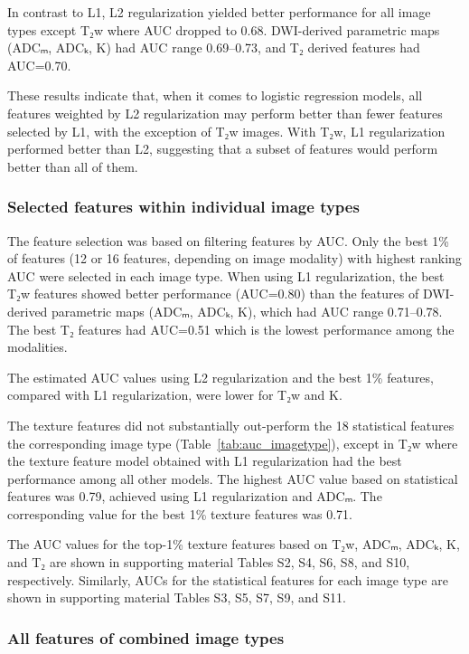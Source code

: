 \documentclass[10pt,letterpaper]{article}
\begin{document}
In contrast to L1, L2 regularization yielded better performance for all image
types except T₂w where AUC dropped to 0.68. DWI-derived parametric maps (ADCₘ,
ADCₖ, K) had AUC range 0.69--0.73, and T₂ derived features had AUC=0.70.

These results indicate that, when it comes to logistic regression models, all
features weighted by L2 regularization may perform better than fewer features
selected by L1, with the exception of T₂w images. With T₂w, L1 regularization
performed better than L2, suggesting that a subset of features would perform
better than all of them.


\subsubsection{Selected features within individual image types}

The feature selection was based on filtering features by AUC\@. Only the best
1\% of features (12 or 16 features, depending on image modality) with highest
ranking AUC were selected in each image type. When using L1 regularization, the
best T₂w features showed better performance (AUC=0.80) than the features of
DWI-derived parametric maps (ADCₘ, ADCₖ, K), which had AUC range 0.71--0.78. The
best T₂ features had AUC=0.51 which is the lowest performance among the
modalities.

The estimated AUC values using L2 regularization and the best 1\% features,
compared with L1 regularization, were lower for T₂w and K.

The texture features did not substantially out-perform the 18 statistical
features the corresponding image type (Table~\ref{tab:auc_imagetype}), except in
T₂w where the texture feature model obtained with L1 regularization had the best
performance among all other models. The highest AUC value based on statistical
features was 0.79, achieved using L1 regularization and ADCₘ. The corresponding
value for the best 1\% texture features was 0.71.

The AUC values for the top-1\% texture features based on T₂w, ADCₘ, ADCₖ, K,
and T₂ are shown in supporting material Tables S2, S4, S6, S8, and S10,
respectively. Similarly, AUCs for the statistical features for each image
type are shown in supporting material Tables S3, S5, S7, S9, and S11.


\subsubsection{All features of combined image types}
\end{document}

